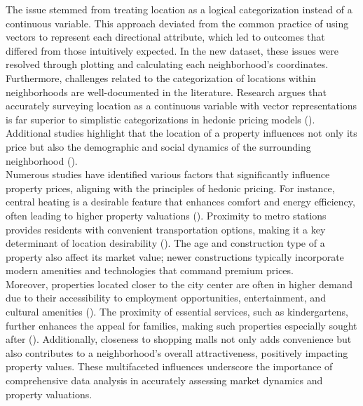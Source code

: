\documentclass[]{article}
\begin{document}
The issue stemmed from treating location as a logical categorization instead of a continuous variable. This approach deviated from the common practice of using vectors to represent each directional attribute, which led to outcomes that differed from those intuitively expected. In the new dataset, these issues were resolved through plotting and calculating each neighborhood's coordinates.\\


Furthermore, challenges related to the categorization of locations within neighborhoods are well-documented in the literature. Research argues that accurately surveying location as a continuous variable with vector representations is far superior to simplistic categorizations in hedonic pricing models (\cite{malpezzi2003}). Additional studies highlight that the location of a property influences not only its price but also the demographic and social dynamics of the surrounding neighborhood (\cite{bayer2004}).\\


Numerous studies have identified various factors that significantly influence property prices, aligning with the principles of hedonic pricing. For instance, central heating is a desirable feature that enhances comfort and energy efficiency, often leading to higher property valuations (\cite{freeman1974}). Proximity to metro stations provides residents with convenient transportation options, making it a key determinant of location desirability (\cite{malpezzi2003}). The age and construction type of a property also affect its market value; newer constructions typically incorporate modern amenities and technologies that command premium prices.\\


Moreover, properties located closer to the city center are often in higher demand due to their accessibility to employment opportunities, entertainment, and cultural amenities (\cite{case1989}). The proximity of essential services, such as kindergartens, further enhances the appeal for families, making such properties especially sought after (\cite{bayer2004}). Additionally, closeness to shopping malls not only adds convenience but also contributes to a neighborhood's overall attractiveness, positively impacting property values. These multifaceted influences underscore the importance of comprehensive data analysis in accurately assessing market dynamics and property valuations.\\


\newpage
\end{document}
